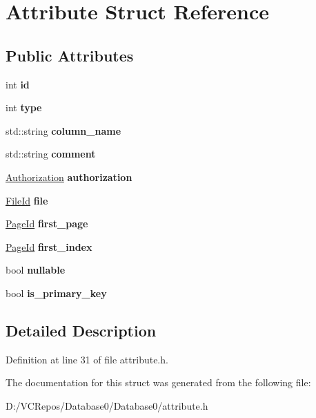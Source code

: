 \hypertarget{struct_attribute}{}\section{Attribute Struct Reference}
\label{struct_attribute}
\subsection*{Public Attributes}
\begin{DoxyCompactItemize}
\item 
\mbox{\label{struct_attribute_accf5a45cbe84d9fbda025b457cf6394e}} 
int {\bfseries id}
\item 
\mbox{\label{struct_attribute_a0db2ea432310aab68de22a43f46aea14}} 
int {\bfseries type}
\item 
\mbox{\label{struct_attribute_a3d5d40ef25d60cb825555afa3414b2eb}} 
std\+::string {\bfseries column\+\_\+name}
\item 
\mbox{\label{struct_attribute_af714e3ae6fb5425fece69d07ebc0962b}} 
std\+::string {\bfseries comment}
\item 
\mbox{\label{struct_attribute_a2e3dbb2046c29750cafaa7d57c3d5dd4}} 
\mbox{\hyperlink{struct_authorization}{Authorization}} {\bfseries authorization}
\item 
\mbox{\label{struct_attribute_a4315e411af8e334e9abfc5d4c9c8d8e3}} 
\mbox{\hyperlink{struct_generic_i_o_id}{File\+Id}} {\bfseries file}
\item 
\mbox{\label{struct_attribute_a0f2f7b61488d75ce63ccab32f7bb41a6}} 
\mbox{\hyperlink{struct_generic_i_o_id}{Page\+Id}} {\bfseries first\+\_\+page}
\item 
\mbox{\label{struct_attribute_a00a8518822b789e15edd8407f192011f}} 
\mbox{\hyperlink{struct_generic_i_o_id}{Page\+Id}} {\bfseries first\+\_\+index}
\item 
\mbox{\label{struct_attribute_aba6cf182018230f5b1bc55727957c265}} 
bool {\bfseries nullable}
\item 
\mbox{\label{struct_attribute_a97bc32a21cf83ce3266fa158e0ead1e8}} 
bool {\bfseries is\+\_\+primary\+\_\+key}
\end{DoxyCompactItemize}


\subsection{Detailed Description}


Definition at line 31 of file attribute.\+h.



The documentation for this struct was generated from the following file\+:\begin{DoxyCompactItemize}
\item 
D\+:/\+V\+C\+Repos/\+Database0/\+Database0/attribute.\+h\end{DoxyCompactItemize}

